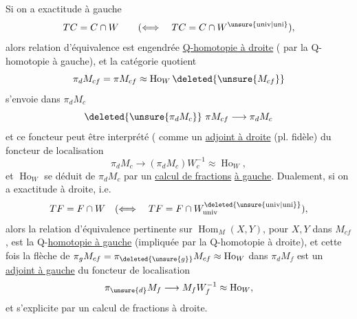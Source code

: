 Si on a exactitude à gauche
\[
 TC=C\cap W\qquad(\Longleftrightarrow\quad TC=C\cap W^{\unsure{\mathrm{univ}|\mathrm{uni}}}),
\]
alors  relation d'équivalence est  engendrée  \uline{Q-homotopie à droite} ( par la Q-homotopie à gauche), et la catégorie quotient
\[
 \pi_{d}M_{cf}=\pi M_{cf}\approx\operatorname{Ho}_{W}\deleted{\unsure{M_{cf}}}
\]
s'envoie dans $\pi_{d}M_{c}$
\[
 \deleted{\unsure{\pi_{d}M_{c}}}\ \pi M_{cf}\longrightarrow\pi_{d}M_{c}
\]
et ce foncteur peut être interprété  (
comme un \uline{adjoint à droite} (pl. fidèle) du foncteur de localisation
\[
 \pi_{d}M_{c}\longrightarrow(\pi_{d}M_{c})W_{c}^{-1}\approx\operatorname{Ho}_{W},
\]
et $\operatorname{Ho}_{W}$ se déduit de $\pi_{d}M_{c}$ par un \uline{calcul de fractions} \uline{à gauche}. Dualement, si on a exactitude à droite,  i.e.
\[
 TF=F\cap W\quad(\Longleftrightarrow\quad TF=F\cap W^{\deleted{\unsure{\mathrm{univ}|\mathrm{uni}}}}_{\mathrm{univ}}),
\]
alors la relation d'équivalence pertinente sur $\operatorname{Hom}_{M}(X,Y)$, pour $X,Y$ dans $M_{cf}$, est la Q-\uline{homotopie à gauche} (impliquée par la Q-homotopie à droite), et cette fois la flèche  de $\pi_{g}M_{cf}=\pi_{\deleted{\unsure{g}}}M_{cf}\approx\operatorname{Ho}_{W}$ dans $\pi_{d}M_{f}$
est un \uline{adjoint à gauche}  du foncteur de localisation
\[
 \pi_{\unsure{d}}M_{f}\longrightarrow M_{f}W_{f}^{-1}\approx\operatorname{Ho}_{W},
\]
et   s'explicite par un calcul de fractions à droite. 

